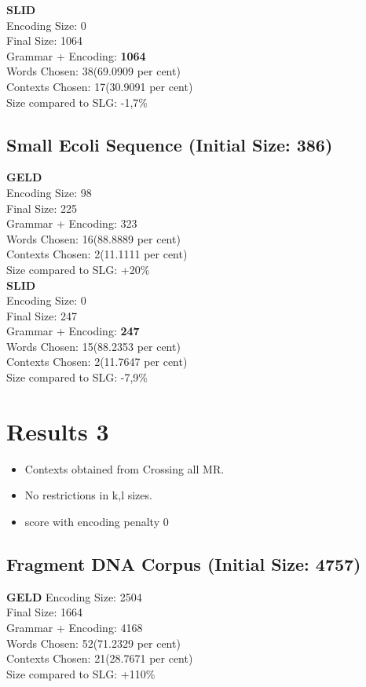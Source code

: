 \textbf{SLID}\\
Encoding Size: 0 \\
Final Size: 1064 \\
Grammar + Encoding: \textbf{1064} \\
Words Chosen: 38(69.0909 per cent) \\
Contexts Chosen: 17(30.9091 per cent) \\
Size compared to SLG:  -1,7\% \\


\subsection{Small Ecoli Sequence (Initial Size: 386)} 
\textbf{GELD}\\
Encoding Size: 98 \\
Final Size: 225 \\
Grammar + Encoding: 323 \\
Words Chosen: 16(88.8889 per cent) \\
Contexts Chosen: 2(11.1111 per cent) \\
Size compared to SLG:  +20\% \\

\textbf{SLID}\\
Encoding Size: 0 \\
Final Size: 247 \\
Grammar + Encoding: \textbf{247} \\
Words Chosen: 15(88.2353 per cent) \\
Contexts Chosen: 2(11.7647 per cent) \\
Size compared to SLG:  -7,9\% \\

\newpage
\section{Results 3}

\begin{itemize}
	\item Contexts obtained from Crossing all MR.
	\item No restrictions in k,l sizes.
	\item score with encoding penalty 0
\end{itemize}

\subsection{Fragment DNA Corpus (Initial Size: 4757)}
\textbf{GELD}
Encoding Size: 2504 \\
Final Size: 1664 \\
Grammar + Encoding: 4168 \\
Words Chosen: 52(71.2329 per cent) \\
Contexts Chosen: 21(28.7671 per cent) \\
Size compared to SLG:  +110\% \\

